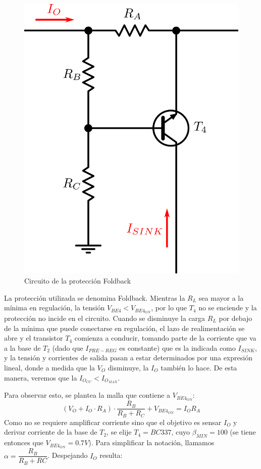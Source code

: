 \begin{figure}[!ht]
\begin{centering}
\includegraphics[scale=0.4]{Imagenes/Proteccion.png}
\par\end{centering}
\caption{Circuito de la protecci\'on Foldback}

\end{figure}

La protecci\'on utilizada se denomina Foldback. Mientras la $R_L$ sea mayor a la m\'inima en regulaci\'on, la tensi\'on $V_{BE4} < V_{BE4_{ON}}$, por lo que $T_4$ no se enciende y la protecci\'on no incide en el circuito. Cuando se disminuye la carga $R_L$ por debajo de la m\'inima que puede conectarse en regulaci\'on, el lazo de realimentaci\'on se abre y el transistor $T_4$ comienza a conducir, tomando parte de la corriente que va a la base de $T_2$ (dado que $I_{PRE-REG}$ es constante) que es la indicada como $I_{SINK}$, y la tensi\'on y corrientes de salida pasan a estar determinados por una expresi\'on lineal, donde a medida que la $V_O$ disminuye, la $I_O$ tambi\'en lo hace. De esta manera, veremos que la $I_{O_{CC}} < I_{O_{MAX}}$.\par
Para observar esto, se plantea la malla que contiene a $V_{BE4_{ON}}$:
\[
(V_O + I_O \cdot R_A)\cdot \frac{R_B}{R_B+R_C} + V_{BE4_{ON}} = I_OR_A
\]
Como no se requiere amplificar corriente sino que el objetivo es sensar $I_O$ y derivar corriente de la base de $T_2$, se elije $T_4 = BC337$, cuyo $\beta_{MIN} = 100$ (se tiene entonces que $V_{BE4_{ON}} = 0.7V$). Para simplificar la notaci\'on, llamamos $\alpha = \dfrac{R_B}{R_B+RC}$. Despejando $I_O$ resulta:

